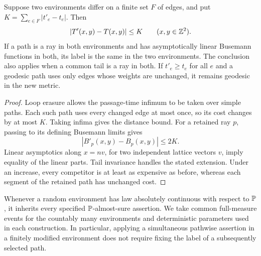 \begin{lemma}\label{lem:finite-change}
Suppose two environments differ on a finite set \(F\) of edges, and put
\(K=\sum_{e\in F}|t'_e-t_e|\). Then
\[
 |T'(x,y)-T(x,y)|\le K\qquad(x,y\in\mathbb Z^2).
\]
If a path is a ray in both environments and has asymptotically linear
Busemann functions in both, its label is the same in the two environments.
The conclusion also applies when a common tail is a ray in both.
If \(t'_e\ge t_e\) for all \(e\) and a geodesic path uses only edges
whose weights are unchanged, it remains geodesic in the new metric.
\end{lemma}
\begin{proof}
Loop erasure allows the passage-time infimum to be taken over simple
paths. Each such path uses every changed edge at most once, so its
cost changes by at most \(K\). Taking infima gives the distance bound.
For a retained ray \(p\), passing to its defining Busemann limits gives
\[
 |B'_p(x,y)-B_p(x,y)|\le2K.
\]
Linear asymptotics along \(x=nv\), for two independent lattice vectors
\(v\), imply equality of the linear parts. Tail invariance handles
the stated extension. Under an increase, every competitor is at least
as expensive as before, whereas each segment of the retained path
has unchanged cost.
\end{proof}

Whenever a random environment has law absolutely continuous with respect
to \(\mathbb P\), it inherits every specified \(\mathbb P\)-almost-sure assertion.
We take common full-measure events for the countably many environments
and deterministic parameters used in each construction. In particular,
applying a simultaneous pathwise assertion in a finitely modified
environment does not require fixing the label of a subsequently selected
path.

